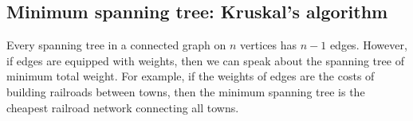 

\setcounter{section}{2}
\setcounter{subsection}{6}
\setcounter{dfn}{15}

\subsection{Minimum spanning tree: Kruskal's algorithm}
Every spanning tree in a connected graph on $n$ vertices has $n-1$ edges.
However, if edges are equipped with weights, then we can speak about the spanning tree of minimum total weight.
For example, if the weights of edges are the costs of building railroads between towns,
then the minimum spanning tree is the cheapest railroad network connecting all towns.


